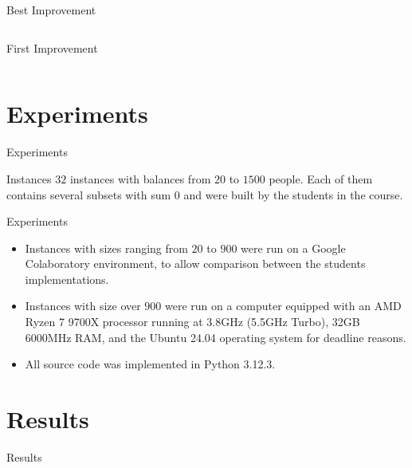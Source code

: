 \documentclass[aspectratio=169,mathserif]{beamer}
\begin{document}
\begin{frame}{Best Improvement}
    \begin{columns}
        \footnotesize{}
    \end{columns}
\end{frame}

\begin{frame}{First Improvement}
    \begin{columns}
        \footnotesize{}
    \end{columns}
\end{frame}

\section{Experiments}

\begin{frame}{Experiments}
    \begin{block}{Instances}
        $32$ instances with balances from $20$ to $1500$ people. Each of them contains several subsets with sum $0$ and were built by the students in the course.
    \end{block}
\end{frame}

\begin{frame}{Experiments}
    \begin{itemize}
        \item Instances with sizes ranging from $20$ to $900$ were run on a Google Colaboratory environment, to allow comparison between the students implementations.
        \item Instances with size over $900$ were run on a computer equipped with an AMD Ryzen 7 9700X processor running at 3.8GHz (5.5GHz Turbo), 32GB 6000MHz RAM, and the Ubuntu 24.04 operating system for deadline reasons.
        \item All source code was implemented in Python 3.12.3.
    \end{itemize}
\end{frame}

\section{Results}

\begin{frame}{Results}
    
\end{frame}
\end{document}
